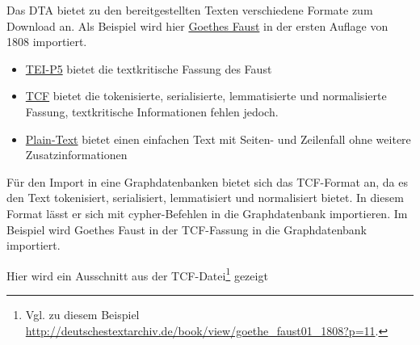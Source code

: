 Das DTA bietet zu den bereitgestellten Texten verschiedene Formate zum
Download an. Als Beispiel wird hier
\href{http://deutschestextarchiv.de/book/show/goethe_faust01_1808}{Goethes
Faust} in der ersten Auflage von 1808 importiert.

\begin{itemize}
\tightlist
\item
  \href{http://deutschestextarchiv.de/book/download_xml/goethe_faust01_1808}{TEI-P5}
  bietet die textkritische Fassung des Faust
\item
  \href{http://deutschestextarchiv.de/book/download_fulltcf/16181}{TCF}
  bietet die tokenisierte, serialisierte, lemmatisierte und
  normalisierte Fassung, textkritische Informationen fehlen jedoch.
\item
  \href{http://deutschestextarchiv.de/book/download_txt/goethe_faust01_1808}{Plain-Text}
  bietet einen einfachen Text mit Seiten- und Zeilenfall ohne weitere
  Zusatzinformationen
\end{itemize}

Für den Import in eine Graphdatenbanken bietet sich das TCF-Format an,
da es den Text tokenisiert, serialisiert, lemmatisiert und normalisiert
bietet. In diesem Format lässt er sich mit cypher-Befehlen in die
Graphdatenbank importieren. Im Beispiel wird Goethes Faust in der
TCF-Fassung in die Graphdatenbank importiert.

Hier wird ein Ausschnitt aus der TCF-Datei\footnote{Vgl. zu diesem
  Beispiel
  \url{http://deutschestextarchiv.de/book/view/goethe_faust01_1808?p=11}.}
gezeigt

\begin{Shaded}
\begin{Highlighting}[]
\KeywordTok{>}
\KeywordTok{>}
\KeywordTok{>}
\KeywordTok{>}
\KeywordTok{>}
\KeywordTok{>}
\KeywordTok{>}
\KeywordTok{>}
\KeywordTok{>}\NormalTok{,}
\KeywordTok{>}
\KeywordTok{>}
\KeywordTok{>}
\KeywordTok{>}
\end{Highlighting}
\end{Shaded}

